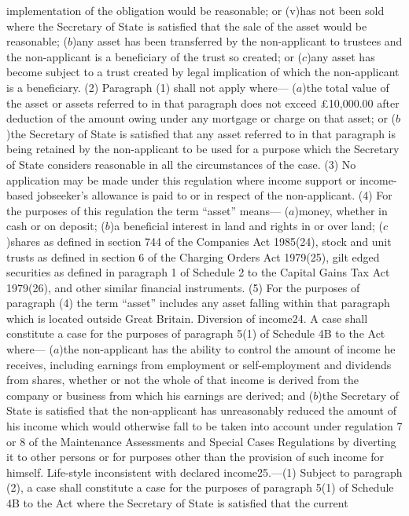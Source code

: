 \documentclass[a4paper]{article}
\begin{document}
implementation of the obligation would be reasonable; or
(v)has not been sold where the Secretary of State is satisfied that the sale of
the asset would be reasonable;
($b$)any asset has been transferred by the non-applicant to trustees and the
non-applicant is a beneficiary of the trust so created; or
($c$)any asset has become subject to a trust created by legal implication of which
the non-applicant is a beneficiary.
(2) Paragraph (1) shall not apply where—
($a$)the total value of the asset or assets referred to in that paragraph does not
exceed £10,000.00 after deduction of the amount owing under any mortgage or
charge on that asset; or
($b$)the Secretary of State is satisfied that any asset referred to in that
paragraph is being retained by the non-applicant to be used for a purpose which
the Secretary of State considers reasonable in all the circumstances of the
case.
(3) No application may be made under this regulation where income support or
income-based jobseeker’s allowance is paid to or in respect of the
non-applicant.
(4) For the purposes of this regulation the term “asset” means—
($a$)money, whether in cash or on deposit;
($b$)a beneficial interest in land and rights in or over land;
($c$)shares as defined in section 744 of the Companies Act 1985(24), stock and
unit trusts as defined in section 6 of the Charging Orders Act 1979(25), gilt
edged securities as defined in paragraph 1 of Schedule 2 to the Capital Gains
Tax Act 1979(26), and other similar financial instruments.
(5) For the purposes of paragraph (4) the term “asset” includes any asset
falling within that paragraph which is located outside Great Britain.
Diversion of income24. A case shall constitute a case for the purposes of
paragraph 5(1) of Schedule 4B to the Act where—
($a$)the non-applicant has the ability to control the amount of income he
receives, including earnings from employment or self-employment and dividends
from shares, whether or not the whole of that income is derived from the company
or business from which his earnings are derived; and
($b$)the Secretary of State is satisfied that the non-applicant has unreasonably
reduced the amount of his income which would otherwise fall to be taken into
account under regulation 7 or 8 of the Maintenance Assessments and Special Cases
Regulations by diverting it to other persons or for purposes other than the
provision of such income for himself.
Life-style inconsistent with declared income25.—(1) Subject to paragraph (2), a
case shall constitute a case for the purposes of paragraph 5(1) of Schedule 4B
to the Act where the Secretary of State is satisfied that the current
\end{document}
